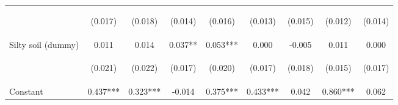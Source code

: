 \begin{center}
\begin{tabular}{lcccccccc}
\vspace{4pt} & \begin{footnotesize}(0.017)\end{footnotesize} & \begin{footnotesize}(0.018)\end{footnotesize} & \begin{footnotesize}(0.014)\end{footnotesize} & \begin{footnotesize}(0.016)\end{footnotesize} & \begin{footnotesize}(0.013)\end{footnotesize} & \begin{footnotesize}(0.015)\end{footnotesize} & \begin{footnotesize}(0.012)\end{footnotesize} & \begin{footnotesize}(0.014)\end{footnotesize} \\
Silty soil (dummy) & 0.011 & 0.014 & 0.037** & 0.053*** & 0.000 & -0.005 & 0.011 & 0.000 \\
\vspace{4pt} & \begin{footnotesize}(0.021)\end{footnotesize} & \begin{footnotesize}(0.022)\end{footnotesize} & \begin{footnotesize}(0.017)\end{footnotesize} & \begin{footnotesize}(0.020)\end{footnotesize} & \begin{footnotesize}(0.017)\end{footnotesize} & \begin{footnotesize}(0.018)\end{footnotesize} & \begin{footnotesize}(0.015)\end{footnotesize} & \begin{footnotesize}(0.017)\end{footnotesize} \\
Constant & 0.437*** & 0.323*** & -0.014 & 0.375*** & 0.433*** & 0.042 & 0.860*** & 0.062 \\

\end{tabular}
\end{center}
